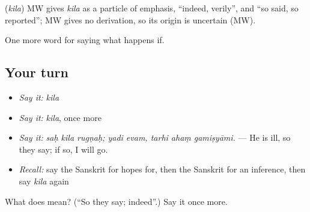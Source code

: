 \begin{cousinweb}
\textbf{} (\emph{kila}) MW gives \emph{kila} as a particle of emphasis, \textquotedblleft{}indeed, verily\textquotedblright{}, and \textquotedblleft{}so said, so reported\textquotedblright{}; MW gives no derivation, so its origin is uncertain (MW).
\end{cousinweb}

\begin{grammarlens}[title={What you've built}]
One more word for saying what happens if.
\end{grammarlens}

\subsection*{Your turn}
\begin{itemize}
\raggedright
  \item \emph{Say it:} \emph{kila}
  \item \emph{Say it:} \emph{kila}, once more
  \item \emph{Say it:} \emph{saḥ kila rugṇaḥ; yadi evam, tarhi ahaṃ gamiṣyāmi.} — He is ill, so they say; if so, I will go.
  \item \emph{Recall:} say the Sanskrit for hopes for, then the Sanskrit for an inference, then say \emph{kila} again
\end{itemize}

\begin{tcolorbox}[breakable,colback=teal!4,colframe=teal!35!black,title={Before you move on}]
What does  mean? (\textquotedblleft{}So they say; indeed\textquotedblright{}.) Say it once more.
\end{tcolorbox}
